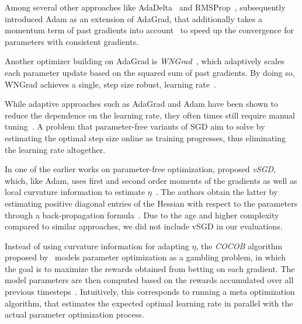 \documentclass[letterpaper]{article} %
\begin{document}
Among several other approaches like AdaDelta~\cite[see e.g.]{zeilerADADELTAAdaptiveLearning2012a} and RMSProp~\cite{tielemanLecture5rmspropDivide2012}, \citet{kingmaAdamMethodStochastic2017b} subsequently introduced Adam as an extension of AdaGrad, that additionally takes a momentum term of past gradients into account~\cite[see]{sutskeverImportanceInitializationMomentum2013} to speed up the convergence for parameters with consistent gradients.

Another optimizer building on AdaGrad is \textit{WNGrad}~\cite{wuWNGradLearnLearning2020}, which adaptively scales each parameter update based on the squared sum of past gradients.
By doing so, WNGrad achieves a single, step size robust, learning rate~\cite{wuWNGradLearnLearning2020}.

While adaptive approaches such as AdaGrad and Adam have been shown to reduce the dependence on the learning rate, they often times still require manual tuning~\cite{wuWNGradLearnLearning2020}.
A problem that parameter-free variants of SGD aim to solve by estimating the optimal step size online as training progresses, thus eliminating the learning rate altogether.

In one of the earlier works on parameter-free optimization, \citet{schaulNoMorePesky2013} proposed \textit{vSGD}, which, like Adam, uses first and second order moments of the gradients as well as local curvature information to estimate $\eta$~\cite{schaulNoMorePesky2013}.
The authors obtain the latter by estimating positive diagonal entries of the Hessian with respect to the parameters through a back-propagation formula~\cite{schaulNoMorePesky2013}.
Due to the age and higher complexity compared to similar approaches, we did not include vSGD in our evaluations.

Instead of using curvature information for adapting $\eta$, the \textit{COCOB} algorithm proposed by~\citet{orabonaTrainingDeepNetworks2017} models parameter optimization as a gambling problem, in which the goal is to maximize the rewards obtained from betting on each gradient.
The model parameters are then computed based on the rewards accumulated over all previous timesteps~\cite{orabonaTrainingDeepNetworks2017}.
Intuitively, this corresponds to running a meta optimization algorithm, that estimates the expected optimal learning rate in parallel with the actual parameter optimization process.
\end{document}
